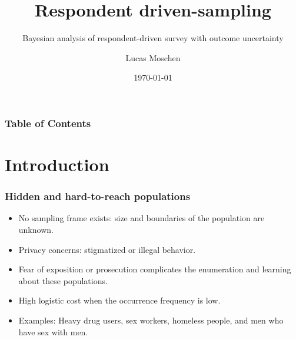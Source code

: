 \documentclass{beamer}
\title[Respondent driven-sampling]
{Respondent driven-sampling}
\subtitle{Bayesian analysis of respondent-driven survey with outcome uncertainty}
\author[Lucas Moschen]
{Lucas Moschen}
\institute[EMAp/FGV]
{
  School of Applied Mathematics\\
  Fundação Getulio Vargas
}
\date[\today]
{\today}
\begin{document}
\frame{\titlepage}

\begin{frame}
\frametitle{Table of Contents}
\tableofcontents
\end{frame}

\section{Introduction}

\begin{frame}
\frametitle{Hidden and hard-to-reach populations}

\begin{itemize}
    \justifying
    \item No sampling frame exists: size and boundaries of the population are unknown.
    \item Privacy concerns: stigmatized or illegal behavior. 
    \item Fear of exposition or prosecution complicates the enumeration and learning about these populations.
    \item High logistic cost when the occurrence frequency is low.
    \item Examples: Heavy drug users, sex workers, homeless people, and men who have sex
    with men. 
\end{itemize}

\end{frame}
\end{document}

